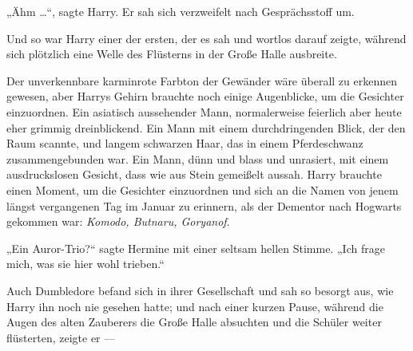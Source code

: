 „Ähm …“, sagte Harry. Er sah sich verzweifelt nach Gesprächsstoff um.

Und so war Harry einer der ersten, der es sah und wortlos darauf zeigte, während sich plötzlich eine Welle des Flüsterns in der Große Halle ausbreite.

Der unverkennbare karminrote Farbton der Gewänder wäre überall zu erkennen gewesen, aber Harrys Gehirn brauchte noch einige Augenblicke, um die Gesichter einzuordnen. Ein asiatisch aussehender Mann, normalerweise feierlich aber heute eher grimmig dreinblickend. Ein Mann mit einem durchdringenden Blick, der den Raum scannte, und langem schwarzen Haar, das in einem Pferdeschwanz zusammengebunden war. Ein Mann, dünn und blass und unrasiert, mit einem ausdruckslosen Gesicht, dass wie aus Stein gemeißelt aussah. Harry brauchte einen Moment, um die Gesichter einzuordnen und sich an die Namen von jenem längst vergangenen Tag im Januar zu erinnern, als der Dementor nach Hogwarts gekommen war: \emph{Komodo, Butnaru, Goryanof}.

„Ein Auror-Trio?“ sagte Hermine mit einer seltsam hellen Stimme.
„Ich frage mich, was sie hier wohl trieben.“

Auch Dumbledore befand sich in ihrer Gesellschaft und sah so besorgt aus, wie Harry ihn noch nie gesehen hatte; und nach einer kurzen Pause, während die Augen des alten Zauberers die Große Halle absuchten und die Schüler weiter flüsterten, zeigte er —

